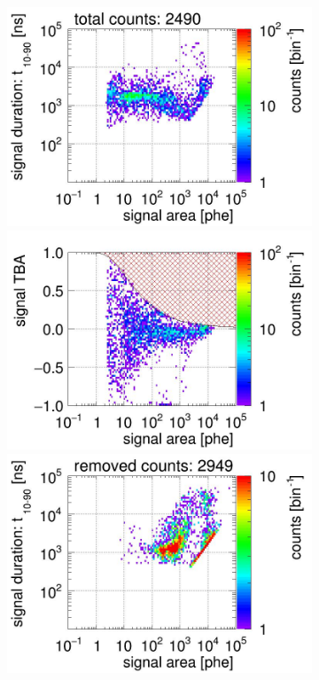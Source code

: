\begin{landscape}
	\begin{figure}[!p]\ContinuedFloat
		\centering
		\begin{subfigure}[t]{0.32\textwidth} %
			\centering
			\includegraphics[width=\figurewidth,clip,trim={0 98 0 15}]{Figures/GasTest/CutsValid/res64767/pdpa07Vecfig64767.jpg}
			\includegraphics[width=\figurewidth,clip,trim={0 98 0 40}]{Figures/GasTest/CutsValid/res64767/tbapa07Vecfig64767.jpg}
			\includegraphics[width=\figurewidth,clip,trim={0 98 0 15}]{Figures/GasTest/CutsValid/res64767/pdpaX07Vecfig64767.jpg}

\end{subfigure}
\end{figure}
\end{landscape}
